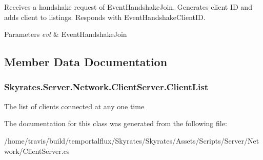 Receives a handshake request of Event\-Handshake\-Join. Generates client I\-D and adds client to listings. Responds with Event\-Handshake\-Client\-I\-D. 


\begin{DoxyParams}{Parameters}
{\em evt} & Event\-Handshake\-Join\\
\hline
\end{DoxyParams}


\subsection{Member Data Documentation}
\hypertarget{class_skyrates_1_1_server_1_1_network_1_1_client_server_a285b4a86c3dda33cf70d8dad87a11ce3}{
\subsubsection[{Client\-List}]{ Skyrates.\-Server.\-Network.\-Client\-Server.\-Client\-List}}\label{class_skyrates_1_1_server_1_1_network_1_1_client_server_a285b4a86c3dda33cf70d8dad87a11ce3}


The list of clients connected at any one time 



The documentation for this class was generated from the following file\-:\begin{DoxyCompactItemize}
\item 
/home/travis/build/temportalflux/\-Skyrates/\-Skyrates/\-Assets/\-Scripts/\-Server/\-Network/Client\-Server.\-cs\end{DoxyCompactItemize}
